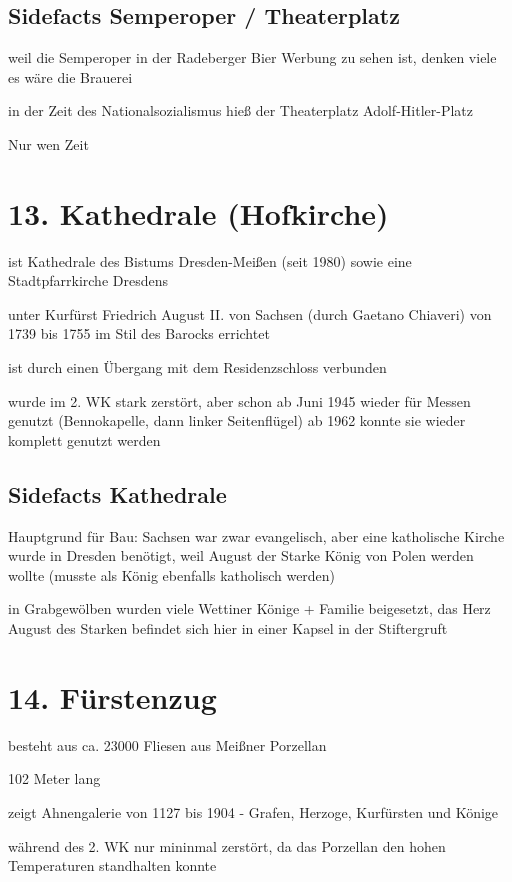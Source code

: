 \documentclass[a4paper,12pt]{report}
\begin{document}
\subsection{Sidefacts Semperoper / Theaterplatz}
\begin{itemize*}
\item weil die Semperoper in der Radeberger Bier Werbung zu sehen ist, denken viele es wäre die Brauerei
\item in der Zeit des Nationalsozialismus hieß der Theaterplatz Adolf-Hitler-Platz
\end{itemize*}

Nur wen Zeit
\section{13. Kathedrale (Hofkirche)}
\begin{itemize*}
\item ist Kathedrale des Bistums Dresden-Meißen (seit 1980) sowie eine Stadtpfarrkirche Dresdens
\item unter Kurfürst Friedrich August II. von Sachsen (durch Gaetano Chiaveri) von 1739 bis 1755 im Stil des Barocks errichtet
\item ist durch einen Übergang mit dem Residenzschloss verbunden
\item wurde im 2. WK stark zerstört, aber schon ab Juni 1945 wieder für Messen genutzt (Bennokapelle, dann linker Seitenflügel) ab 1962 konnte sie wieder komplett genutzt werden
\end{itemize*}
\subsection{Sidefacts Kathedrale}
\begin{itemize*}
\item Hauptgrund für Bau: Sachsen war zwar evangelisch, aber eine katholische Kirche wurde in Dresden benötigt, weil August der Starke König von Polen werden wollte (musste als König ebenfalls katholisch werden)
\item in Grabgewölben wurden viele Wettiner Könige + Familie beigesetzt, das Herz August des Starken befindet sich hier in einer Kapsel in der Stiftergruft
\end{itemize*}

\section{14. Fürstenzug}
\begin{itemize*}
\item besteht aus ca. 23000 Fliesen aus Meißner Porzellan
\item 102 Meter lang
\item zeigt Ahnengalerie von 1127 bis 1904 - Grafen, Herzoge, Kurfürsten und Könige
\item während des 2. WK nur mininmal zerstört, da das Porzellan den hohen Temperaturen standhalten konnte
\end{itemize*}
\end{document}
